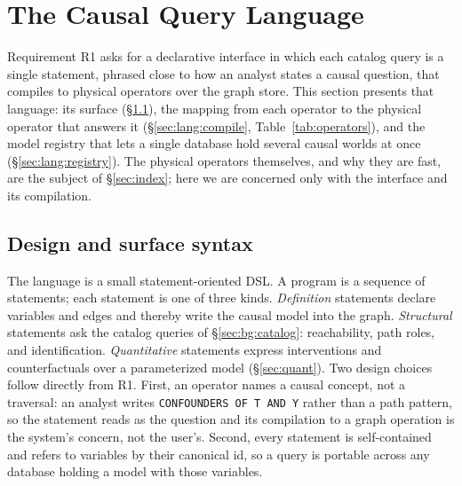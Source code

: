 \section{The Causal Query Language}\label{sec:lang}

Requirement R1 asks for a declarative interface in which each catalog query is a
single statement, phrased close to how an analyst states a causal question, that
compiles to physical operators over the graph store. This section presents that
language: its surface (\S\ref{sec:lang:surface}), the mapping from each operator
to the physical operator that answers it (\S\ref{sec:lang:compile},
Table~\ref{tab:operators}), and the model registry that lets a single database
hold several causal worlds at once (\S\ref{sec:lang:registry}). The physical
operators themselves, and why they are fast, are the subject of
\S\ref{sec:index}; here we are concerned only with the interface and its
compilation.

\subsection{Design and surface syntax}\label{sec:lang:surface}

The language is a small statement-oriented DSL. A program is a sequence of
statements; each statement is one of three kinds. \emph{Definition} statements
declare variables and edges and thereby write the causal model into the graph.
\emph{Structural} statements ask the catalog queries of \S\ref{sec:bg:catalog}:
reachability, path roles, and identification. \emph{Quantitative} statements
express interventions and counterfactuals over a parameterized model
(\S\ref{sec:quant}). Two design choices follow directly from R1. First, an
operator names a causal concept, not a traversal: an analyst writes
\lstinline[style=causaldsl]|CONFOUNDERS OF T AND Y| rather than a path pattern,
so the statement reads as the question and its compilation to a graph operation
is the system's concern, not the user's. Second, every statement is
self-contained and refers to variables by their canonical
\textsf{id}, so a query is portable across any database holding a model with
those variables.

